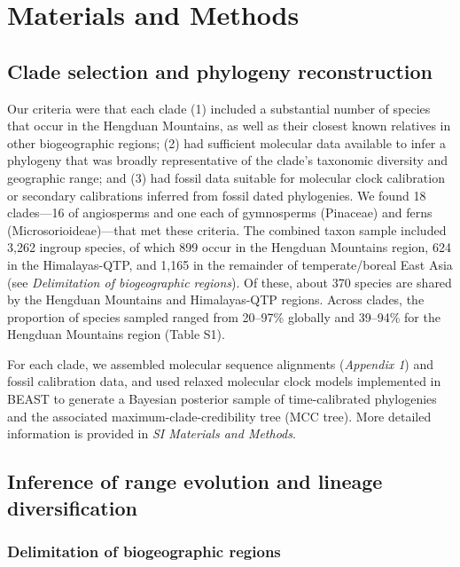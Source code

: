 \section{Materials and Methods}

\subsection{Clade selection and phylogeny reconstruction}

Our criteria were that each clade (1) included a substantial number of species that occur in the Hengduan Mountains, as well as their closest known relatives in other biogeographic regions; (2) had sufficient molecular data available to infer a phylogeny that was broadly representative of the clade's taxonomic diversity and geographic range; and (3) had fossil data suitable for molecular clock calibration or secondary calibrations inferred from fossil dated phylogenies. We found 18 clades---16 of angiosperms and one each of gymnosperms (Pinaceae) and ferns (Microsorioideae)---that met these criteria. The combined taxon sample included 3,262 ingroup species, of which 899 occur in the Hengduan Mountains region, 624 in the Himalayas-QTP, and 1,165 in the remainder of temperate/boreal East Asia (see \textit{Delimitation of biogeographic regions}). Of these, about 370 species are shared by the Hengduan Mountains and Himalayas-QTP regions. Across clades, the proportion of species sampled ranged from 20--97\% globally and 39--94\% for the Hengduan Mountains region (Table S1).

For each clade, we assembled molecular sequence alignments (\textit{Appendix 1}) and fossil calibration data, and used relaxed molecular clock models implemented in BEAST \citep{Drummond2012,Bouckaert2014} to generate a Bayesian posterior sample of time-calibrated phylogenies and the associated maximum-clade-credibility tree (MCC tree).  More detailed information is provided in \textit{SI Materials and Methods}.


\subsection{Inference of range evolution and lineage diversification}

\subsubsection{Delimitation of biogeographic regions}

